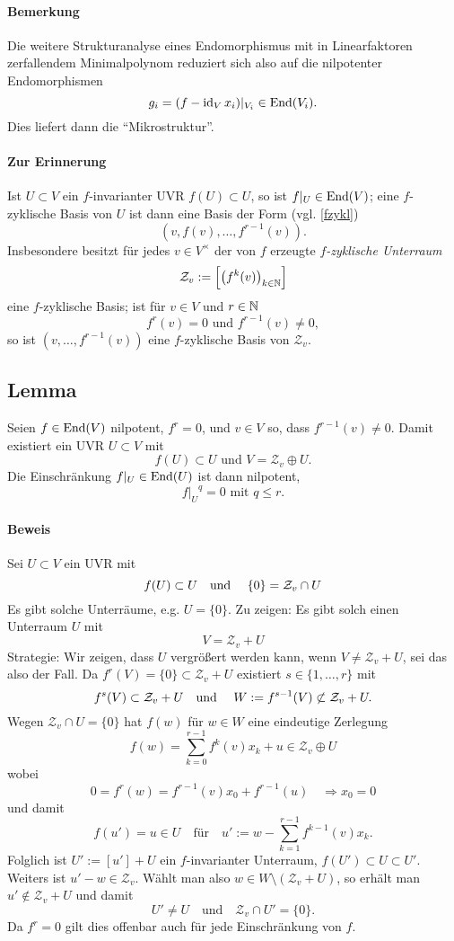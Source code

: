 \paragraph{Bemerkung}
	Die weitere Strukturanalyse eines Endomorphismus mit in Linearfaktoren zerfallendem Minimalpolynom reduziert sich also auf die nilpotenter Endomorphismen
		\[ g_i = (f-\operatorname{id}_Vx_i)|_{V_i}\in \operatorname{End}(V_i). \]
	Dies liefert dann die "`Mikrostruktur"'.
\paragraph{Zur Erinnerung}
	Ist $ U\subset V $ ein $ f $-invarianter UVR $ f(U)\subset U $, so ist $ f|_U\in \operatorname{End}(V) $; eine $ f $-zyklische Basis von $ U $ ist dann eine Basis der Form (vgl. \ref{fzykl})
		\[ \left(v,f(v),\dots,f^{r-1}(v)\right). \]
	Insbesondere besitzt für jedes $ v\in V^\times $ der von $ f $ erzeugte \emph{$ f $-zyklische Unterraum}
		\[ \mathcal{Z}_v := \left[\left(f^k(v)\right)_{k\in \mathbb{N}}\right] \]
	eine $ f $-zyklische Basis; ist für $ v\in V $ und $ r\in \mathbb{N} $
		\[ f^r(v) = 0 \text{ und }f^{r-1}(v)\neq 0, \]
	so ist $ (v,\dots,f^{r-1}(v)) $ eine $ f $-zyklische Basis von $ \mathcal{Z}_v $.
\subsection{Lemma}
	Seien $ f\in \operatorname{End}(V) $ nilpotent, $ f^r = 0 $, und $ v\in V $ so, dass $ f^{r-1}(v)\neq 0 $. Damit existiert ein UVR $ U\subset V $ mit
		\[ f(U)\subset U \text{ und } V = \mathcal{Z}_v \oplus U. \]
	Die Einschränkung $ f|_U \in \operatorname{End}(U) $ ist dann nilpotent,
		\[ {f|_U}^q = 0 \text{ mit } q\leq r. \]
\paragraph{Beweis}
	Sei $U\subset V$ ein UVR mit
		\[f(U)\subset U \text{\quad und \quad} \{0\}=\mathcal{Z}_v\cap U\]
	Es gibt solche Unterräume, e.g. $U=\{0\}$. Zu zeigen: Es gibt solch einen Unterraum $U$ mit
		\[V=\mathcal{Z}_v+U\]
	Strategie: Wir zeigen, dass $U$ vergrößert werden kann, wenn $V\neq \mathcal{Z}_v+U$, sei das also der Fall.
	Da $f^r(V)=\{0\}\subset \mathcal{Z}_v+U$ existiert $s\in\{1,\dots,r\}$ mit
		\[f^s(V)\subset \mathcal{Z}_v+U \text{\quad und \quad} W:=f^{s-1}(V)\not\subset \mathcal{Z}_v+U. \]
	Wegen $\mathcal{Z}_v\cap U  = \{0\}$ hat $f(w)$ für $w\in W$ eine eindeutige Zerlegung
		\[f(w)=\sum_{k=0}^{r-1}f^k(v)x_k+u \in \mathcal{Z}_v \oplus U\]
	wobei
		\[0=f^r(w)=f^{r-1}(v)x_0+f^{r-1}(u) \quad\Rightarrow x_0=0\]
	und damit
		\[f(u')=u\in U \quad\text{für}\quad u':=w-\sum_{k=1}^{r-1} f^{k-1}(v)x_k. \]
	Folglich ist $U':=[u']+U$ ein $f$-invarianter Unterraum, $f(U')\subset U \subset U'$.
	Weiters ist $u'-w\in \mathcal{Z}_v$.
	Wählt man also $w\in W\setminus(\mathcal{Z}_v+U)$, so erhält man $u'\notin \mathcal{Z}_v+U$ und damit
		\[U'\neq U \quad\text{und}\quad \mathcal{Z}_v\cap U'=\{0\}.\]
	Da $f^r=0$ gilt dies offenbar auch für jede Einschränkung von $f$.

